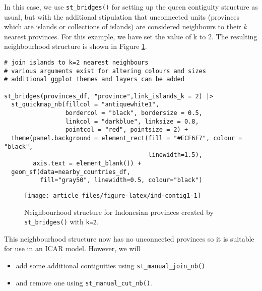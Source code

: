 In this case, we use \texttt{st\_bridges()} for setting up the queen contiguity
structure as usual, but with the additional stipulation that unconnected
units (provinces which are islands or collections of islands) are
considered neighbours to their \emph{k} nearest provinces. For this example,
we have set the value of k to 2. The resulting neighbourhood structure
is shown in Figure \ref{fig:ind-contig1}.



\begin{verbatim}
# join islands to k=2 nearest neighbours
# various arguments exist for altering colours and sizes
# additional ggplot themes and layers can be added

st_bridges(provinces_df, "province",link_islands_k = 2) |> 
  st_quickmap_nb(fillcol = "antiquewhite1", 
                 bordercol = "black", bordersize = 0.5, 
                 linkcol = "darkblue", linksize = 0.8, 
                 pointcol = "red", pointsize = 2) + 
  theme(panel.background = element_rect(fill = "#ECF6F7", colour = "black", 
                                        linewidth=1.5),
        axis.text = element_blank()) +
  geom_sf(data=nearby_countries_df, 
          fill="gray50", linewidth=0.5, colour="black")
\end{verbatim}

\begin{figure}

{\centering \texttt{[image: article\_files/figure-latex/ind-contig1-1]} 

}

\caption{Neighbourhood structure for Indonesian provinces created by \texttt{st\_bridges()} with \texttt{k=2}.}\label{fig:ind-contig1}
\end{figure}

This neighbourhood structure now has no unconnected provinces so it is
suitable for use in an ICAR model. However, we will

\begin{itemize}
\item
  add some additional contiguities using \texttt{st\_manual\_join\_nb()}
\item
  and remove one using \texttt{st\_manual\_cut\_nb()}.
\end{itemize}

